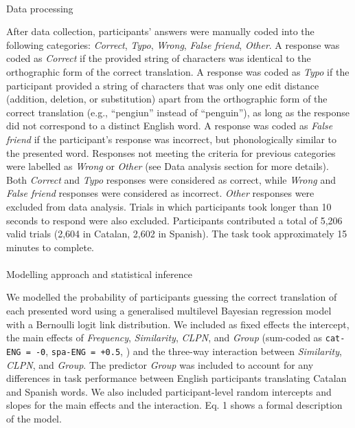 \documentclass[
]{article}
\makeatletter
\let\oldparagraph\paragraph
\renewcommand{\paragraph}{
    \@ifstar
      \xxxParagraphStar
      \xxxParagraphNoStar
  }
\newcommand{\xxxParagraphStar}[1]{\oldparagraph*{#1}\mbox{}}
\newcommand{\xxxParagraphNoStar}[1]{\oldparagraph{#1}\mbox{}}
\makeatother
\begin{document}
\paragraph{Data processing}\label{data-processing}

After data collection, participants' answers were manually coded into
the following categories: \emph{Correct}, \emph{Typo}, \emph{Wrong},
\emph{False friend}, \emph{Other}. A response was coded as
\emph{Correct} if the provided string of characters was identical to the
orthographic form of the correct translation. A response was coded as
\emph{Typo} if the participant provided a string of characters that was
only one edit distance (addition, deletion, or substitution) apart from
the orthographic form of the correct translation (e.g., ``pengiun''
instead of ``penguin''), as long as the response did not correspond to a
distinct English word. A response was coded as \emph{False friend} if
the participant's response was incorrect, but phonologically similar to
the presented word. Responses not meeting the criteria for previous
categories were labelled as \emph{Wrong} or \emph{Other} (see Data
analysis section for more details). Both \emph{Correct} and \emph{Typo}
responses were considered as correct, while \emph{Wrong} and \emph{False
friend} responses were considered as incorrect. \emph{Other} responses
were excluded from data analysis. Trials in which participants took
longer than 10 seconds to respond were also excluded. Participants
contributed a total of 5,206 valid trials (2,604 in Catalan, 2,602 in
Spanish). The task took approximately 15 minutes to complete.

\paragraph{Modelling approach and statistical
inference}\label{modelling-approach-and-statistical-inference}

We modelled the probability of participants guessing the correct
translation of each presented word using a generalised multilevel
Bayesian regression model with a Bernoulli logit link distribution. We
included as fixed effects the intercept, the main effects of
\emph{Frequency}, \emph{Similarity}, \emph{CLPN}, and \emph{Group}
(sum-coded as \texttt{cat-ENG\ =\ -0}, \texttt{spa-ENG\ =\ +0.5},
) and the
three-way interaction between \emph{Similarity}, \emph{CLPN}, and
\emph{Group}. The predictor \emph{Group} was included to account for any
differences in task performance between English participants translating
Catalan and Spanish words. We also included participant-level random
intercepts and slopes for the main effects and the interaction. Eq. 1
shows a formal description of the model.
\end{document}
